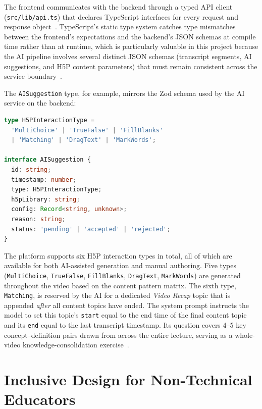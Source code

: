 The frontend communicates with the backend through a typed API client
(\texttt{src/lib/api.ts}) that declares TypeScript interfaces for every
request and response object~\cite{typescript2023}. TypeScript's static type
system catches type mismatches between the frontend's expectations and the
backend's JSON schemas at compile time rather than at runtime, which is
particularly valuable in this project because the AI pipeline involves
several distinct JSON schemas (transcript segments, AI suggestions, and H5P
content parameters) that must remain consistent across the service
boundary~\cite{typescript2023}.

The \texttt{AISuggestion} type, for example, mirrors the Zod schema used
by the AI service on the backend:

\begin{lstlisting}[language=TypeScript,caption={AISuggestion TypeScript interface (6 supported types)}]
type H5PInteractionType =
  'MultiChoice' | 'TrueFalse' | 'FillBlanks'
  | 'Matching' | 'DragText' | 'MarkWords';

interface AISuggestion {
  id: string;
  timestamp: number;
  type: H5PInteractionType;
  h5pLibrary: string;
  config: Record<string, unknown>;
  reason: string;
  status: 'pending' | 'accepted' | 'rejected';
}
\end{lstlisting}

The platform supports six H5P interaction types in total, all of which
are available for both AI-assisted generation and manual authoring.
Five types (\texttt{MultiChoice}, \texttt{TrueFalse}, \texttt{FillBlanks},
\texttt{DragText}, \texttt{MarkWords}) are generated throughout the video
based on the content pattern matrix. The sixth type, \texttt{Matching},
is reserved by the AI for a dedicated \emph{Video Recap} topic that is
appended \emph{after} all content topics have ended. The system prompt
instructs the model to set this topic's \texttt{start} equal to the end
time of the final content topic and its \texttt{end} equal to the last
transcript timestamp. Its question covers 4--5 key concept--definition
pairs drawn from across the entire lecture, serving as a
whole-video knowledge-consolidation exercise~\cite{anderson2001}.

\section{Inclusive Design for Non-Technical Educators}
\label{sec:inclusive_design}

